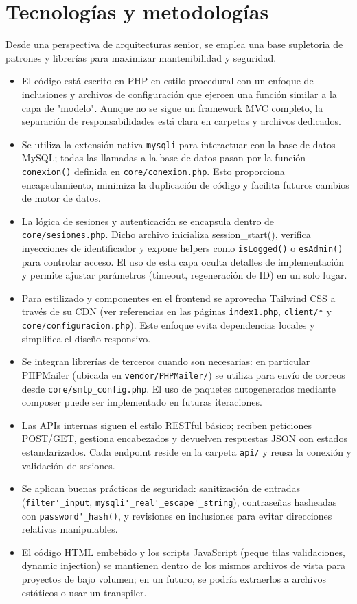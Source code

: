 \documentclass[a4paper,12pt]{article}
\begin{document}
\section{Tecnolog\'ias y metodolog\'ias}
Desde una perspectiva de arquitecturas senior, se emplea una base supletoria de patrones y librer\'ias para maximizar mantenibilidad y seguridad.
\begin{itemize}
  \item El c\'odigo est\'a escrito en PHP en estilo procedural con un enfoque de inclusiones y archivos de configuraci\'on que ejercen una funci\'on similar a la capa de "modelo". Aunque no se sigue un framework MVC completo, la separaci\'on de responsabilidades est\'a clara en carpetas y archivos dedicados.
  \item Se utiliza la extensi\'on nativa \texttt{mysqli} para interactuar con la base de datos MySQL; todas las llamadas a la base de datos pasan por la funci\'on \texttt{conexion()} definida en \texttt{core/conexion.php}. Esto proporciona encapsulamiento, minimiza la duplicaci\'on de c\'odigo y facilita futuros cambios de motor de datos.
  \item La l\'ogica de sesiones y autenticaci\'on se encapsula dentro de \texttt{core/sesiones.php}. Dicho archivo inicializa session\_start(), verifica inyecciones de identificador y expone helpers como \texttt{isLogged()} o \texttt{esAdmin()} para controlar acceso. El uso de esta capa oculta detalles de implementaci\'on y permite ajustar par\'ametros (timeout, regeneraci\'on de ID) en un solo lugar.
  \item Para estilizado y componentes en el frontend se aprovecha Tailwind CSS a trav\'es de su CDN (ver referencias en las p\'aginas \texttt{index1.php}, \texttt{client/*} y \texttt{core/configuracion.php}). Este enfoque evita dependencias locales y simplifica el dise\~no responsivo.
  \item Se integran librer\'ias de terceros cuando son necesarias: en particular PHPMailer (ubicada en \texttt{vendor/PHPMailer/}) se utiliza para env\'io de correos desde \texttt{core/smtp\_config.php}. El uso de paquetes autogenerados mediante composer puede ser implementado en futuras iteraciones.
  \item Las APIs internas siguen el estilo RESTful b\'asico; reciben peticiones POST/GET, gestiona encabezados y devuelven respuestas JSON con estados estandarizados. Cada endpoint reside en la carpeta \texttt{api/} y reusa la conexi\'on y validaci\'on de sesiones.
  \item Se aplican buenas pr\'acticas de seguridad: sanitizaci\'on de entradas (\texttt{filter\'_input}, \texttt{mysqli\'_real\'_escape\'_string}), contrase\~nas hasheadas con \texttt{password\'_hash()}, y revisiones en inclusiones para evitar direcciones relativas manipulables.
  \item El c\'odigo HTML embebido y los scripts JavaScript (peque
tilas validaciones, dynamic injection) se mantienen dentro de los mismos archivos de vista para proyectos de bajo volumen; en un futuro, se podr\'ia extraerlos a archivos est\'aticos o usar un transpiler.
\end{itemize}
\end{document}
